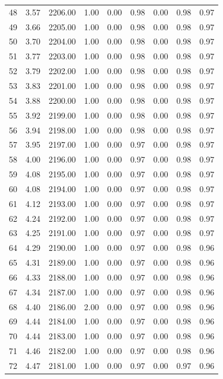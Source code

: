 \documentclass{article}\usepackage[]{graphicx}\usepackage[]{color}
\begin{document}
\begin{longtable}{rrrrrrrrr}
  48 & 3.57 & 2206.00 & 1.00 & 0.00 & 0.98 & 0.00 & 0.98 & 0.97 \\ 
  49 & 3.66 & 2205.00 & 1.00 & 0.00 & 0.98 & 0.00 & 0.98 & 0.97 \\ 
  50 & 3.70 & 2204.00 & 1.00 & 0.00 & 0.98 & 0.00 & 0.98 & 0.97 \\ 
  51 & 3.77 & 2203.00 & 1.00 & 0.00 & 0.98 & 0.00 & 0.98 & 0.97 \\ 
  52 & 3.79 & 2202.00 & 1.00 & 0.00 & 0.98 & 0.00 & 0.98 & 0.97 \\ 
  53 & 3.83 & 2201.00 & 1.00 & 0.00 & 0.98 & 0.00 & 0.98 & 0.97 \\ 
  54 & 3.88 & 2200.00 & 1.00 & 0.00 & 0.98 & 0.00 & 0.98 & 0.97 \\ 
  55 & 3.92 & 2199.00 & 1.00 & 0.00 & 0.98 & 0.00 & 0.98 & 0.97 \\ 
  56 & 3.94 & 2198.00 & 1.00 & 0.00 & 0.98 & 0.00 & 0.98 & 0.97 \\ 
  57 & 3.95 & 2197.00 & 1.00 & 0.00 & 0.97 & 0.00 & 0.98 & 0.97 \\ 
  58 & 4.00 & 2196.00 & 1.00 & 0.00 & 0.97 & 0.00 & 0.98 & 0.97 \\ 
  59 & 4.08 & 2195.00 & 1.00 & 0.00 & 0.97 & 0.00 & 0.98 & 0.97 \\ 
  60 & 4.08 & 2194.00 & 1.00 & 0.00 & 0.97 & 0.00 & 0.98 & 0.97 \\ 
  61 & 4.12 & 2193.00 & 1.00 & 0.00 & 0.97 & 0.00 & 0.98 & 0.97 \\ 
  62 & 4.24 & 2192.00 & 1.00 & 0.00 & 0.97 & 0.00 & 0.98 & 0.97 \\ 
  63 & 4.25 & 2191.00 & 1.00 & 0.00 & 0.97 & 0.00 & 0.98 & 0.97 \\ 
  64 & 4.29 & 2190.00 & 1.00 & 0.00 & 0.97 & 0.00 & 0.98 & 0.96 \\ 
  65 & 4.31 & 2189.00 & 1.00 & 0.00 & 0.97 & 0.00 & 0.98 & 0.96 \\ 
  66 & 4.33 & 2188.00 & 1.00 & 0.00 & 0.97 & 0.00 & 0.98 & 0.96 \\ 
  67 & 4.34 & 2187.00 & 1.00 & 0.00 & 0.97 & 0.00 & 0.98 & 0.96 \\ 
  68 & 4.40 & 2186.00 & 2.00 & 0.00 & 0.97 & 0.00 & 0.98 & 0.96 \\ 
  69 & 4.44 & 2184.00 & 1.00 & 0.00 & 0.97 & 0.00 & 0.98 & 0.96 \\ 
  70 & 4.44 & 2183.00 & 1.00 & 0.00 & 0.97 & 0.00 & 0.98 & 0.96 \\ 
  71 & 4.46 & 2182.00 & 1.00 & 0.00 & 0.97 & 0.00 & 0.98 & 0.96 \\ 
  72 & 4.47 & 2181.00 & 1.00 & 0.00 & 0.97 & 0.00 & 0.97 & 0.96 \\ 

\end{longtable}
\end{document}
